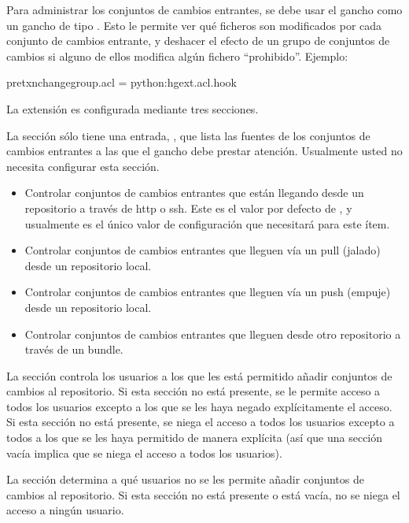 Para administrar los conjuntos de cambios entrantes, se debe usar el
gancho  como un gancho de tipo .
Esto le permite ver qué ficheros son modificados por cada conjunto de
cambios entrante, y deshacer el efecto de un grupo de conjuntos de
cambios si alguno de ellos modifica algún fichero ``prohibido''.
Ejemplo:
\begin{codesample2}
  [hooks]
  pretxnchangegroup.acl = python:hgext.acl.hook
\end{codesample2}

La extensión  es configurada mediante tres secciones.

La sección  sólo tiene una entrada,
, que lista las fuentes de los
conjuntos de cambios entrantes a las que el gancho debe prestar
atención. Usualmente usted no necesita configurar esta sección.
\begin{itemize}
  \item[\rcitem{acl}{serve}] Controlar conjuntos de
    cambios entrantes que están llegando desde un repositorio a
    través de http o ssh. Este es el valor por defecto de
  , y usualmente es el único valor de
  configuración que necesitará para este ítem.
\item[\rcitem{acl}{pull}] Controlar conjuntos de cambios entrantes que
  lleguen vía un pull (jalado) desde un repositorio local.
\item[\rcitem{acl}{push}] Controlar conjuntos de cambios entrantes que
  lleguen vía un push (empuje) desde un repositorio local.
\item[\rcitem{acl}{bundle}] Controlar conjuntos de cambios entrantes
  que lleguen desde otro repositorio a través de un bundle.
\end{itemize}

La sección  controla los usuarios a los que les
está permitido añadir conjuntos de cambios al repositorio. Si esta
sección no está presente, se le permite acceso a todos los usuarios
excepto  a los que se les haya negado explícitamente el acceso. Si
esta sección no está presente, se niega el acceso a todos los usuarios
excepto a todos a los que se les haya permitido de manera explícita
(así que una sección vacía implica que se niega el acceso a todos los
usuarios).

La sección  determina a qué usuarios no se les
permite añadir conjuntos de cambios al repositorio. Si esta sección no
está presente o está vacía, no se niega el acceso a ningún usuario.

